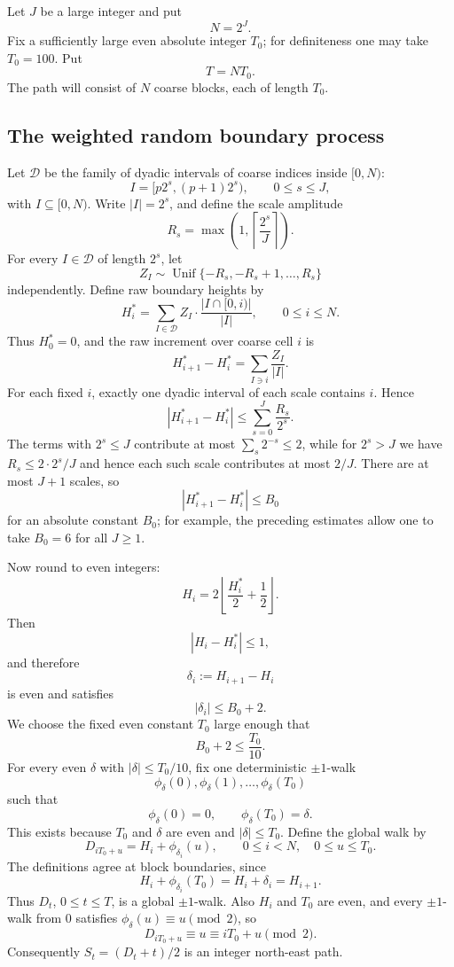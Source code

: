 \documentclass[11pt]{article}
\theoremstyle{definition}
\theoremstyle{remark}
\newcommand{\1}{\mathbf 1}
\begin{document}
\bigskip
\noindent
Let $J$ be a large integer and put
\[
N=2^J.
\]
Fix a sufficiently large even absolute integer $T_0$; for definiteness one
may take $T_0=100$.  Put
\[
T=NT_0.
\]
The path will consist of $N$ coarse blocks, each of length $T_0$.

\subsection{The weighted random boundary process}

Let $\mathcal D$ be the family of dyadic intervals of coarse indices inside
$[0,N)$:
\[
I=[p2^s,(p+1)2^s),
\qquad 0\le s\le J,
\]
with $I\subseteq[0,N)$.  Write $|I|=2^s$, and define the scale amplitude
\[
R_s=\max\left(1,\left\lceil \frac{2^s}{J}\right\rceil\right).
\]
For every $I\in\mathcal D$ of length $2^s$, let
\[
Z_I\sim \operatorname{Unif}\{-R_s,-R_s+1,\ldots,R_s\}
\]
independently.  Define raw boundary heights by
\[
H_i^*=\sum_{I\in\mathcal D}Z_I\cdot\frac{|I\cap[0,i)|}{|I|},
\qquad 0\le i\le N.
\]
Thus $H_0^*=0$, and the raw increment over coarse cell $i$ is
\[
H_{i+1}^*-H_i^*=\sum_{I\ni i}\frac{Z_I}{|I|}.
\]
For each fixed $i$, exactly one dyadic interval of each scale contains
$i$.  Hence
\[
|H_{i+1}^*-H_i^*|
\le \sum_{s=0}^J \frac{R_s}{2^s}.
\]
The terms with $2^s\le J$ contribute at most $\sum_s 2^{-s}\le2$, while for $2^s>J$ we have $R_s\le 2\cdot 2^s/J$ and hence each such scale contributes at most $2/J$.  There are at most $J+1$ scales, so
\[
|H_{i+1}^*-H_i^*|\le B_0
\]
for an absolute constant $B_0$; for example, the preceding estimates allow one to take $B_0=6$ for all $J\ge1$.

\bigskip
\noindent
Now round to even integers:
\[
H_i=2\left\lfloor \frac{H_i^*}{2}+\frac12\right\rfloor.
\]
Then
\[
|H_i-H_i^*|\le1,
\]
and therefore
\[
\delta_i:=H_{i+1}-H_i
\]
is even and satisfies
\[
|\delta_i|\le B_0+2.
\]
We choose the fixed even constant $T_0$ large enough that
\[
B_0+2\le \frac{T_0}{10}.
\]
For every even $\delta$ with $|\delta|\le T_0/10$, fix one deterministic $\pm1$-walk
\[
\phi_\delta(0),\phi_\delta(1),\ldots,\phi_\delta(T_0)
\]
such that
\[
\phi_\delta(0)=0,
\qquad
\phi_\delta(T_0)=\delta.
\]
This exists because $T_0$ and $\delta$ are even and $|\delta|\le T_0$. Define the global walk by
\[
D_{iT_0+u}=H_i+\phi_{\delta_i}(u),
\qquad 0\le i<N,
\quad 0\le u\le T_0.
\]
The definitions agree at block boundaries, since
\[
H_i+\phi_{\delta_i}(T_0)=H_i+\delta_i=H_{i+1}.
\]
Thus $D_t$, $0\le t\le T$, is a global $\pm1$-walk.  Also $H_i$ and $T_0$ are even, and every $\pm1$-walk from $0$ satisfies $\phi_\delta(u)\equiv u\pmod2$, so
\[
D_{iT_0+u}\equiv u\equiv iT_0+u\pmod2.
\]
Consequently $S_t=(D_t+t)/2$ is an integer north-east path.
\end{document}
